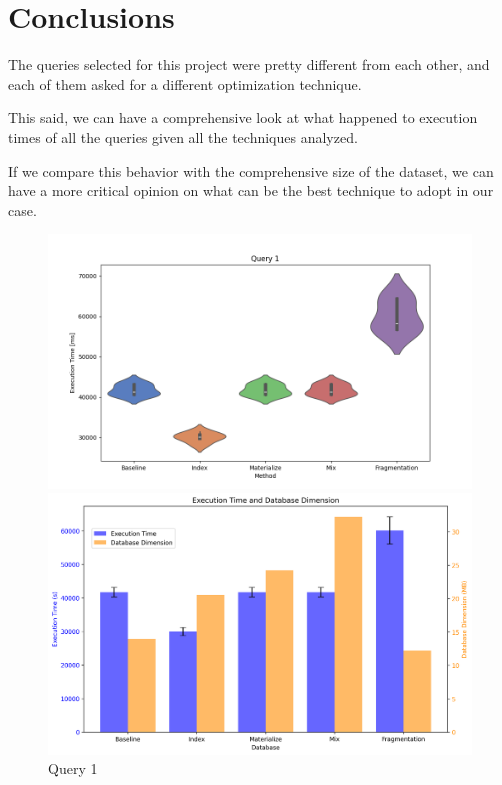 \section{Conclusions}

The queries selected for this project were pretty different from each other, and each of them asked for a different optimization technique.

This said, we can have a comprehensive look at what happened to execution times of all the queries given all the techniques analyzed.

If we compare this behavior with the comprehensive size of the dataset, we can have a more critical opinion on what can be the best technique to adopt in our case.

\begin{figure}[h!] 
\centering 
\begin{minipage}{0.5\textwidth} 
\centering \includegraphics[width=\linewidth]{images/query1.png}  
\end{minipage}
\begin{minipage}{0.45\textwidth} 
\centering 
\includegraphics[width=\linewidth]{images/double_barplot_q1.png} 
\end{minipage} 
\caption{Query 1} 
\end{figure}

